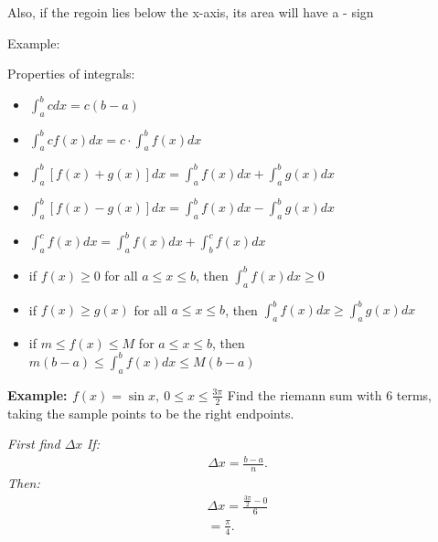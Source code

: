 \documentclass{report}
\begin{document}
\bigbreak \noindent 
Also, if the regoin lies below the x-axis, its area will have a - sign

\bigbreak \noindent \bigbreak \noindent 
Example:

\begin{figure}[ht]
  \centering
  \label{fig:aothuohu}
\end{figure}

\bigbreak \noindent 
\begin{mdframed}
  Properties of integrals:
  \begin{itemize}
    \item $\int_{a}^{b} cdx = c(b-a) $ 
    \item $\int_{a}^{b}cf(x)dx = c \cdot \int_{a}^{b}f(x)dx $
    \item $\int_{a}^{b}[f(x) + g(x)]dx = \int_{a}^{b}f(x)dx + \int_{a}^{b}g(x)dx$
    \item $\int_{a}^{b}[f(x) - g(x)]dx = \int_{a}^{b}f(x)dx - \int_{a}^{b}g(x)dx$
    \item $\int_{a}^{c}f(x)dx = \int_{a}^{b}f(x)dx + \int_{b}^{c}f(x)dx $
    \item if $f(x) \geq 0$ for all $a \leq x \leq b$, then $\int_{a}^{b}f(x)dx \geq  0 $
    \item if $f(x) \geq g(x) $ for all $a \leq x \leq b$, then $\int_{a}^{b}f(x)dx \geq \int_{a}^{b}g(x)dx $
    \item if $m \leq f(x) \leq M $ for $a \leq x \leq b$, then $m(b-a) \leq \int_{a}^{b}f(x)dx \leq M(b-a)$
  \end{itemize}
\end{mdframed}

\bigbreak \noindent 
\begin{mdframed}
  \textbf{Example: $f(x) = \sin{x},\ 0 \leq x \leq \frac{3\pi}{2} $}
  \bigbreak \noindent 
  Find the riemann sum with 6 terms, taking the sample points to be the right endpoints.
\end{mdframed}

\bigbreak \noindent 
\textit{First find $\Delta x$}
\bigbreak \noindent 
\textit{If:}
\begin{align*}
  \Delta x = \frac{b-a}{n}
.\end{align*}
\bigbreak \noindent 
\textit{Then:}
\begin{align*}
  \Delta x = \frac{\frac{3\pi}{2}-0}{6} \\
  = \frac{\pi}{4}
.\end{align*}
\end{document}
